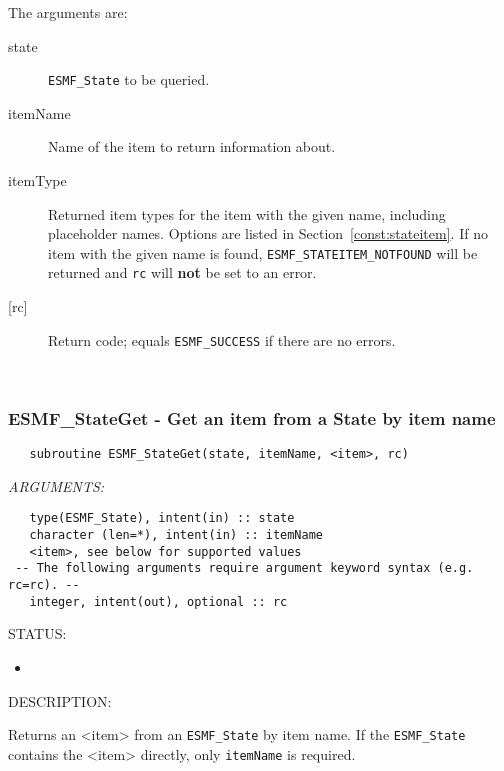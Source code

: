    The arguments are:
   \begin{description}
   \item[state]
   {\tt ESMF\_State} to be queried.
   \item[itemName]
   Name of the item to return information about.
   \item[itemType]
   Returned item types for the item with the given name, including
   placeholder names. Options are
   listed in Section~\ref{const:stateitem}. If no item with the
   given name is found, {\tt ESMF\_STATEITEM\_NOTFOUND} will be returned
   and {\tt rc} will {\bf not} be set to an error.
   \item[{[rc]}]
   Return code; equals {\tt ESMF\_SUCCESS} if there are no errors.
   \end{description}
  
   
 
\mbox{}\hrulefill\ 
 
\subsubsection [ESMF\_StateGet] {ESMF\_StateGet - Get an item from a State by item name}


  
\begin{verbatim}   subroutine ESMF_StateGet(state, itemName, <item>, rc)\end{verbatim}{\em ARGUMENTS:}
\begin{verbatim}   type(ESMF_State), intent(in) :: state
   character (len=*), intent(in) :: itemName
   <item>, see below for supported values
 -- The following arguments require argument keyword syntax (e.g. rc=rc). --
   integer, intent(out), optional :: rc\end{verbatim}
{\sf STATUS:}
   \begin{itemize}
   \item{}
   \end{itemize}
  
{\sf DESCRIPTION:\\ }


   \begin{sloppypar}
   Returns an <item> from an {\tt ESMF\_State} by item name.
   If the {\tt ESMF\_State} contains the <item> directly, only
   {\tt itemName} is required.
   \end{sloppypar}
  
